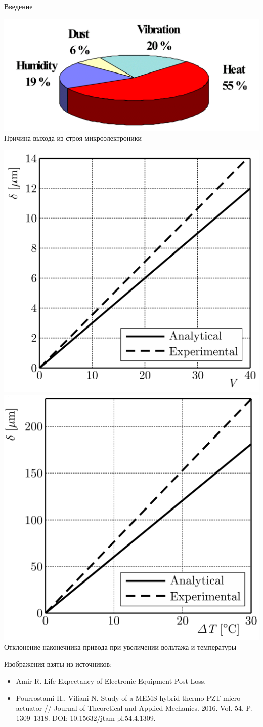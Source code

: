 \begin{frame}{Введение}
	\begin{minipage}{0.39\textwidth}
	\begin{center}
		\includegraphics[width=\linewidth]{pics/EquipmentFailure.png} \\
		Причина выхода из строя микроэлектроники
	\end{center}
	\end{minipage}
	\hfill
	\begin{minipage}{0.59\textwidth}
		\includegraphics[width=0.49\linewidth]{pics/VoltageVariation.png}
		\includegraphics[width=0.49\linewidth]{pics/TemperatureVariation.png} \\
		Отклонение наконечника привода при увеличении вольтажа и температуры
	\end{minipage}
	
	\bigskip	
	
	Изображения взяты из источников:
	\begin{itemize}
		\justifying
		\item Amir R. Life Expectancy of Electronic Equipment Post-Loss.
		\item Pourrostami H., Viliani N. Study of a MEMS hybrid thermo-PZT micro actuator // Journal of Theoretical and Applied Mechanics. 2016. Vol. 54. P. 1309--1318. DOI: 10.15632/jtam-pl.54.4.1309. 
	\end{itemize}
\end{frame}

